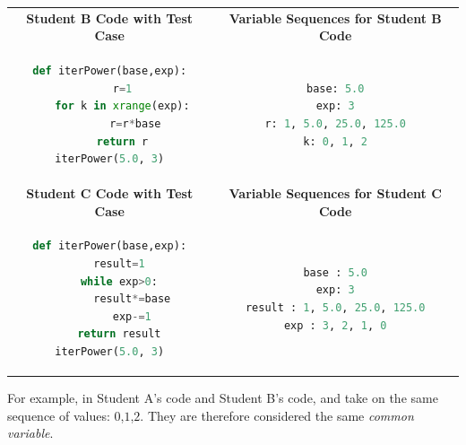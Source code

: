 \begin{tabular}{cc}
{\bf Student B Code with Test Case} & {\bf Variable Sequences for Student B Code} \\
\begin{minipage}{0.5\linewidth}
\begin{lstlisting}[language=python]
def iterPower(base,exp):
    r=1
    for k in xrange(exp):
        r=r*base
    return r
iterPower(5.0, 3)
\end{lstlisting}
\end{minipage}
&
\begin{minipage}{0.5\linewidth}
\begin{lstlisting}[language=python]
base: 5.0
exp: 3
r: 1, 5.0, 25.0, 125.0
k: 0, 1, 2
\end{lstlisting}
\end{minipage} \\
{\bf Student C Code with Test Case} & {\bf Variable Sequences for Student C Code} \\
\begin{minipage}{0.5\linewidth}
\begin{lstlisting}[language=python]
def iterPower(base,exp):
   result=1
   while exp>0:
       result*=base
       exp-=1
   return result
iterPower(5.0, 3)
\end{lstlisting}
\end{minipage}
&
\begin{minipage}{0.5\linewidth}
\begin{lstlisting}[language=python]
base : 5.0
exp: 3
result : 1, 5.0, 25.0, 125.0
exp : 3, 2, 1, 0
\end{lstlisting}
\end{minipage} \\
\end{tabular}

For example, in Student A's code and Student B's code,  and  take on the same sequence of values: $0$,$1$,$2$. They are therefore considered the same {\it common variable}.

